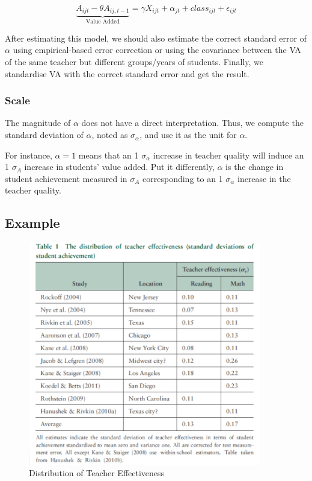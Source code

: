             $$\underbrace{A_{ijt} - \theta A_{ij,t-1}}_{\text{Value Added}} = \gamma X_{ijt} + \alpha_{jt} + class_{ijt}+ \epsilon_{ijt}$$

            After estimating this model, we should also estimate the correct standard error of $\alpha$ using empirical-based error correction or using the covariance between the VA of the same teacher but different groups/years of students. Finally, we standardise VA with the correct standard error and get the result.


        
        \subsubsection{Scale}
            The magnitude of $\alpha$ does not have a direct interpretation. Thus, we compute the standard deviation of $\alpha$, noted as $\sigma_\alpha$, and use it as the unit for $\alpha$.

            For instance, $\alpha=1$ means that an 1 $\sigma_\alpha$ increase in teacher quality will induce an 1 $\sigma_A$ increase in students' value added. Put it differently, $\alpha$ is the change in student achievement measured in $\sigma_A$ corresponding to an 1 $\sigma_\alpha$ increase in the teacher quality.
        
    
    \subsection{Example}

        \begin{figure}[H]
            \centering
            \includegraphics[width=4in]{images/ch9/9 hanushek rivkin.png}
            \caption{Distribution of Teacher Effectiveness}
        \end{figure}
        

